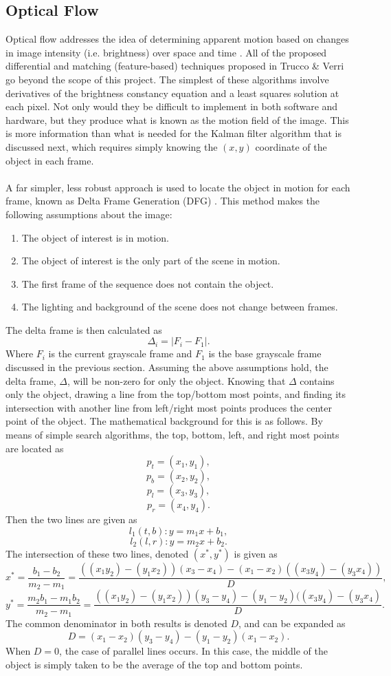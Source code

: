 \documentclass[11pt]{article} %
\begin{document}
\subsection{Optical Flow}
\label{sec:of}
Optical flow addresses the idea of determining apparent motion based on changes in image intensity (i.e. brightness) over space and time \cite{4}. All of the proposed differential and matching (feature-based) techniques proposed in Trucco \& Verri \cite{4} go beyond the scope of this project. The simplest of these algorithms involve derivatives of the brightness constancy equation and a least squares solution at each pixel. Not only would they be difficult to implement in both software and hardware, but they produce what is known as the motion field of the image. This is more information than what is needed for the Kalman filter algorithm that is discussed next, which requires simply knowing the $(x,y)$ coordinate of the object in each frame. \\\\
A far simpler, less robust approach is used to locate the object in motion for each frame, known as Delta Frame Generation (DFG) \cite{8}. This method makes the following assumptions about the image:
\begin{enumerate}
\item The object of interest is in motion.
\item The object of interest is the only part of the scene in motion.
\item The first frame of the sequence does not contain the object.
\item The lighting and background of the scene does not change between frames.
\end{enumerate}
The delta frame is then calculated as 
\begin{equation}
\Delta_i = | F_i - F_1 |.
\end{equation}
Where $F_i$ is the current grayscale frame and $F_1$ is the base grayscale frame discussed in the previous section. Assuming the above assumptions hold, the delta frame, $\Delta$, will be non-zero for only the object. Knowing that $\Delta$ contains only the object, drawing a line from the top/bottom most points, and finding its intersection with another line from left/right most points produces the center point of the object. The mathematical background for this is as follows. By means of simple search algorithms, the top, bottom, left, and right most points are located as
\[
p_t = (x_1, y_1) ,
\]
\[
p_b = (x_2, y_2) ,
\]
\[
p_l = (x_3, y_3) ,
\]
\[
p_r = (x_4, y_4) .
\]
Then the two lines are given as 
\[
l_1(t,b): y = m_1 x + b_1,
\]
\[
l_2(l,r): y = m_2 x + b_2.
\]
The intersection of these two lines, denoted $(x^*, y^*)$ is given as
\[
x^* = \frac{b_1 - b_2}{m_2 - m_1} = \frac{((x_1y_2) - (y_1x_2))(x_3 - x_4) - (x_1 - x_2)((x_3y_4) - (y_3x_4))}{D},
\]
\[
y^*  = \frac{m_2 b_1 - m_1 b_2}{m_2 - m_1} = \frac{((x_1y_2) - (y_1x_2))(y_3 - y_4) - (y_1 - y_2)((x_3y_4) - (y_3x_4)}{D}.
\]
The common denominator in both results is denoted $D$, and can be expanded as
\[
D = (x_1 - x_2)(y_3 - y_4) - (y_1 - y_2)(x_1 - x_2).
\]
When $D = 0$, the case of parallel lines occurs. In this case, the middle of the object is simply taken to be the average of the top and bottom points.
\end{document}
